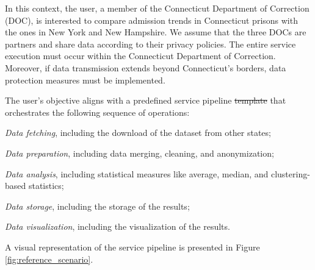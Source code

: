 In this context, the user, a member of the Connecticut Department of Correction (DOC), is interested to compare admission trends in Connecticut prisons with the ones in New York and New Hampshire. We assume that the three DOCs are partners and share data according to their privacy policies. The entire service execution must occur within the Connecticut Department of Correction. Moreover, if data transmission extends beyond Connecticut's borders, data protection measures must be implemented.

The user's objective aligns with a predefined service pipeline \st{template} that orchestrates the following sequence of operations:
\begin{enumerate*}[label=(\roman*)]
  \item \emph{Data fetching}, including the download of the dataset from other states;
  \item \emph{Data preparation}, including data merging, cleaning, and anonymization;
  \item \emph{Data analysis}, including statistical measures like average, median, and clustering-based statistics;
  \item \emph{Data storage}, including the storage of the results;
  \item \emph{Data visualization}, including the visualization of the results.
\end{enumerate*}
A visual representation of the service pipeline is presented in Figure \ref{fig:reference_scenario}.

